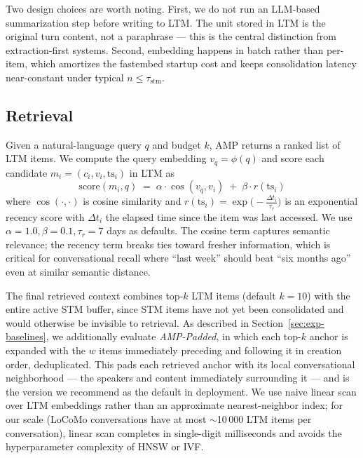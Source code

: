 Two design choices are worth noting. First, we do not run an LLM-based summarization step before writing to LTM. The unit stored in LTM is the original turn content, not a paraphrase --- this is the central distinction from extraction-first systems. Second, embedding happens in batch rather than per-item, which amortizes the fastembed startup cost and keeps consolidation latency near-constant under typical $n \leq \tau_{\text{stm}}$.

\subsection{Retrieval}
\label{sec:method-retrieval}

Given a natural-language query $q$ and budget $k$, AMP returns a ranked list of LTM items. We compute the query embedding $v_q = \phi(q)$ and score each candidate $m_i = (c_i, v_i, \text{ts}_i)$ in LTM as
\begin{equation}
    \text{score}(m_i, q) \;=\; \alpha \cdot \cos(v_q, v_i) \;+\; \beta \cdot r(\text{ts}_i)
    \label{eq:score}
\end{equation}
where $\cos(\cdot,\cdot)$ is cosine similarity and $r(\text{ts}_i) = \exp\!\bigl(-\frac{\Delta t_i}{\tau_r}\bigr)$ is an exponential recency score with $\Delta t_i$ the elapsed time since the item was last accessed. We use $\alpha = 1.0, \beta = 0.1, \tau_r = 7$ days as defaults. The cosine term captures semantic relevance; the recency term breaks ties toward fresher information, which is critical for conversational recall where ``last week'' should beat ``six months ago'' even at similar semantic distance.

The final retrieved context combines top-$k$ LTM items (default $k = 10$) with the entire active STM buffer, since STM items have not yet been consolidated and would otherwise be invisible to retrieval. As described in Section~\ref{sec:exp-baselines}, we additionally evaluate \emph{AMP-Padded}, in which each top-$k$ anchor is expanded with the $w$ items immediately preceding and following it in creation order, deduplicated. This pads each retrieved anchor with its local conversational neighborhood --- the speakers and content immediately surrounding it --- and is the version we recommend as the default in deployment. We use naive linear scan over LTM embeddings rather than an approximate nearest-neighbor index; for our scale (LoCoMo conversations have at most $\sim$10\,000 LTM items per conversation), linear scan completes in single-digit milliseconds and avoids the hyperparameter complexity of HNSW or IVF.

